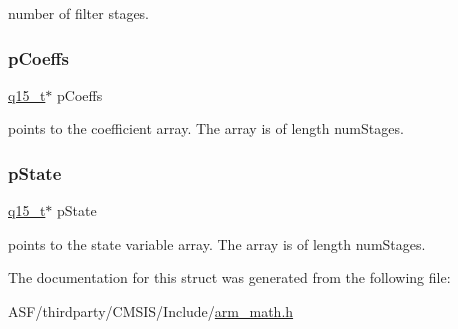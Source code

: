 number of filter stages. \mbox{\label{structarm__fir__lattice__instance__q15_a7ca181a37f714d174445f486bebce26f}} 
\subsubsection{\texorpdfstring{pCoeffs}{pCoeffs}}
{\footnotesize\ttfamily \mbox{\hyperlink{arm__math_8h_ab5a8fb21a5b3b983d5f54f31614052ea}{q15\+\_\+t}}$\ast$ p\+Coeffs}

points to the coefficient array. The array is of length num\+Stages. \mbox{\label{structarm__fir__lattice__instance__q15_ae29dfdb736374fcddaeaec4b7770170c}} 
\subsubsection{\texorpdfstring{pState}{pState}}
{\footnotesize\ttfamily \mbox{\hyperlink{arm__math_8h_ab5a8fb21a5b3b983d5f54f31614052ea}{q15\+\_\+t}}$\ast$ p\+State}

points to the state variable array. The array is of length num\+Stages. 

The documentation for this struct was generated from the following file\+:\begin{DoxyCompactItemize}
\item 
A\+S\+F/thirdparty/\+C\+M\+S\+I\+S/\+Include/\mbox{\hyperlink{arm__math_8h}{arm\+\_\+math.\+h}}\end{DoxyCompactItemize}
